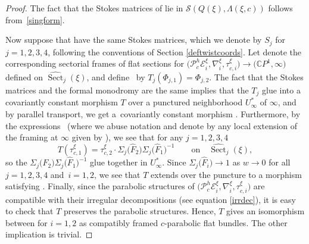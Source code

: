 \documentclass[11pt]{article}
\numberwithin{equation}{section}
\numberwithin{equation}{section}
\newcommand{\CP}{\mathbb{C}P^1}
\begin{document}
\begin{proof}
The fact that the Stokes matrices of  lie in $\mathcal{S}(Q(\xi),\Lambda(\xi,c))$ follows from~\eqref{singform}.

Now suppose that  have the same Stokes matrices, which we denote by $S_j$ for $j=1,2,3,4$, following the conventions of Section \ref{deftwistcoords}. Let  denote the corresponding sectorial frames of flat sections for $\bigl(\mathcal{P}^h_{c}\mathcal{E}^{\xi}_i,\nabla^{\xi}_i, \tau_{c,i}^{\xi}\bigr)\to \bigl(\CP,\infty\bigr)$ defined on $\widehat{\operatorname{Sect}}_j(\xi)$, and define~ by $T_j(\Phi_{j,1})=\Phi_{j,2}$. The fact that the Stokes matrices and the formal monodromy are the same implies that the $T_j$ glue into a covariantly constant morphism $T$ over a punctured neighborhood $U_{\infty}^*$ of $\infty$, and by parallel transport, we get a~covariantly constant morphism \smash{$T\colon\mathcal{P}^h_{c}\mathcal{E}^{\xi}_1|_{\CP \setminus \{\infty\}}\to \mathcal{P}^h_{c}\mathcal{E}^{\xi}_2|_{\CP \setminus \{\infty\}}$}. Furthermore, by the expressions~ \big(where we abuse notation and denote by  any local extension of the framing at $\infty$ given by \big), we see that for any $j=1,2,3,4$
\begin{equation*}
 T(\tau_{c,1}^{\xi})=\tau_{c,2}^{\xi}\cdot \Sigma_j\bigl(\widehat{F}_2\bigr)\Sigma_j\bigl(\widehat{F}_1\bigr)^{-1}\qquad \text{on}\quad \widehat{\operatorname{Sect}}_j(\xi),
\end{equation*}
so the $\Sigma_j\bigl(\widehat{F}_2\bigr)\Sigma_j\bigl(\widehat{F}_1\bigr)^{-1}$ glue together in $U_{\infty}^*$. Since $\Sigma_j\bigl(\widehat{F}_i\bigr)\to 1$ as $w\to 0$ for all $j=1,2, 3,4$ and~${i\!=\!1,2}$, we see that $T$ extends over the puncture to a morphism satisfying . Finally, since the parabolic structures of $\bigl(\mathcal{P}^h_{c}\mathcal{E}^{\xi}_i,\nabla^{\xi}_i, \tau_{c,i}^{\xi}\bigr)$ are compatible with their irregular decompositions (see equation \eqref{irrdec}), it is easy to check that $T$ preserves the parabolic structures. Hence, $T$ gives an isomorphism between  for $i=1,2$ as compatibly framed $c$-parabolic flat bundles. The other implication is trivial.


\end{proof}
\end{document}
